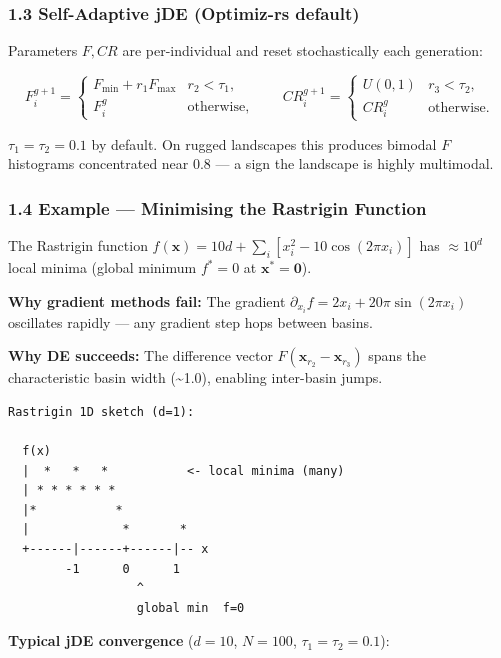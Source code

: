 \documentclass[11pt,a4paper]{article}
\begin{document}
\subsubsection{1.3 Self-Adaptive jDE (Optimiz-rs default)}\label{self-adaptive-jde-optimiz-rs-default}

Parameters \(F,CR\) are per-individual and reset stochastically each generation:

\[
F_i^{g+1} = \begin{cases} F_{\min} + r_1 F_{\max} & r_2 < \tau_1,\\ F_i^g & \text{otherwise,}\end{cases}
\qquad
CR_i^{g+1} = \begin{cases} U(0,1) & r_3 < \tau_2,\\ CR_i^g & \text{otherwise.}\end{cases}
\]

\(\tau_1=\tau_2=0.1\) by default. On rugged landscapes this produces bimodal \(F\) histograms concentrated near 0.8 --- a sign the landscape is highly multimodal.

\subsubsection{1.4 Example --- Minimising the Rastrigin Function}\label{example-minimising-the-rastrigin-function}

The Rastrigin function \(f(\mathbf{x}) = 10d + \sum_i[x_i^2 - 10\cos(2\pi x_i)]\) has \(\approx 10^d\) local minima (global minimum \(f^*=0\) at \(\mathbf{x}^*=\mathbf{0}\)).

\textbf{Why gradient methods fail:} The gradient \(\partial_{x_i}f = 2x_i + 20\pi\sin(2\pi x_i)\) oscillates rapidly --- any gradient step hops between basins.

\textbf{Why DE succeeds:} The difference vector \(F(\mathbf{x}_{r_2}-\mathbf{x}_{r_3})\) spans the characteristic basin width (\textasciitilde1.0), enabling inter-basin jumps.

\begin{verbatim}
Rastrigin 1D sketch (d=1):

  f(x)
  |  *   *   *           <- local minima (many)
  | * * * * * *
  |*           *
  |             *       *
  +------|------+------|-- x
        -1      0      1
                  ^
                  global min  f=0
\end{verbatim}

\textbf{Typical jDE convergence} (\(d=10\), \(N=100\), \(\tau_1=\tau_2=0.1\)):
\end{document}

